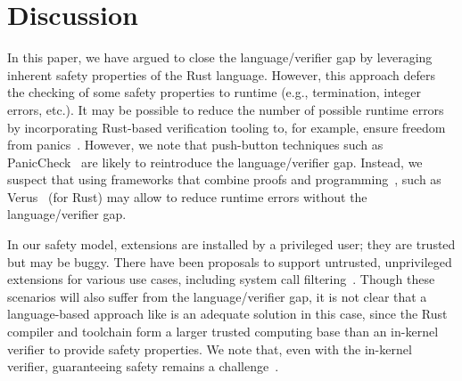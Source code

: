 \section{Discussion}
\label{sec:discussion}

 In this paper, we have argued to
close the language/verifier gap by leveraging inherent safety
properties of the Rust language.  However, this approach defers the
checking of some safety properties to runtime (e.g., termination,
integer errors, etc.).  It may be possible to reduce the number of
possible runtime errors by incorporating Rust-based verification
tooling to, for example, ensure freedom from
panics~\cite{verus,paniccheck,rvt}.  However, we note that push-button
techniques such as PanicCheck~\cite{paniccheck} are likely to
reintroduce the language/verifier gap.  Instead, we suspect that using
frameworks that combine proofs and programming~\cite{coq,dafny}, such
as Verus~\cite{verus} (for Rust) may allow \projname{} to reduce
runtime errors without the language/verifier gap.

 In our safety model, extensions are
installed by a privileged user; they are trusted but may be buggy.
There have been proposals to support untrusted, unprivileged
extensions for various use cases, including system call
filtering~\cite{jia2023}.  Though these scenarios will also
suffer from the language/verifier gap, it is not clear that a
language-based approach like \projname{} is an adequate solution in
this case, since the Rust compiler and toolchain form a larger trusted
computing base than an in-kernel verifier to provide safety
properties.  We note that, even with the in-kernel verifier,
guaranteeing safety remains a
challenge~\cite{untenableVerification,ebpf-stackoverflow,ebpf-termination}.



